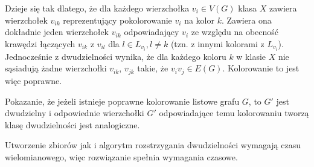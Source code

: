 Dzieje się tak dlatego, że dla każdego wierzchołka $v_i\in V(G)$ klasa $X$ zawiera wierzchołek $v_{ik}$ reprezentujący pokolorowanie $v_i$ na kolor $k$. Zawiera ona dokładnie jeden wierzchołek $v_{ik}$ odpowiadający $v_i$ ze względu na obecność krawędzi łączących $v_{ik}$ z $v_{il}$ dla $l \in L_{v_i}, l \neq k$ (tzn. z innymi kolorami z $L_{v_i}$). Jednocześnie z dwudzielności wynika, że dla każdego koloru $k$ w klasie $X$ nie sąsiadują żadne wierzchołki $v_{ik}$, $v_{jk}$ takie, że $v_iv_j\in E(G)$. Kolorowanie to jest więc poprawne.


Pokazanie, że jeżeli istnieje poprawne kolorowanie listowe grafu $G$, to $G'$ jest dwudzielny i odpowiednie wierzchołki $G'$ odpowiadające temu kolorowaniu tworzą klasę dwudzielności jest analogiczne. 

Utworzenie zbiorów jak i algorytm rozstrzygania dwudzielności wymagają czasu wielomianowego, więc rozwiązanie spełnia wymagania czasowe.

